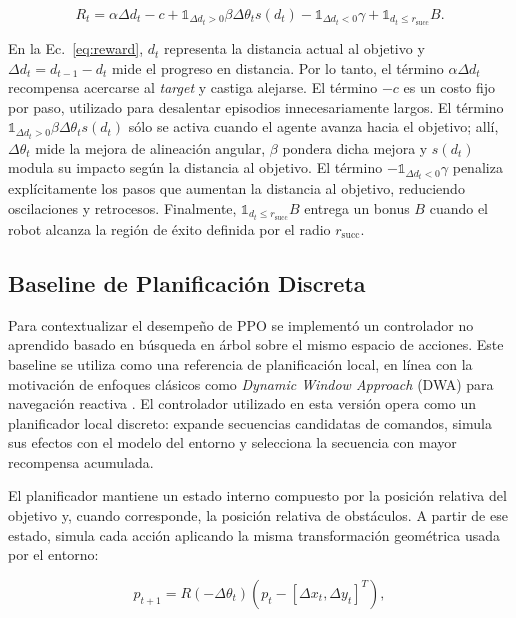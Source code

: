\documentclass[conference]{IEEEtran}
\begin{document}
\begin{equation}
    R_t =
    \alpha \Delta d_t
    - c
    + \mathbb{1}_{\Delta d_t > 0}\beta \Delta \theta_t s(d_t)
    - \mathbb{1}_{\Delta d_t < 0}\gamma
    + \mathbb{1}_{d_t \leq r_{\text{succ}}}B .
    \label{eq:reward}
\end{equation}

En la Ec.~\ref{eq:reward}, $d_t$ representa la distancia actual al objetivo y $\Delta d_t=d_{t-1}-d_t$ mide el progreso en distancia. Por lo tanto, el término $\alpha\Delta d_t$ recompensa acercarse al \textit{target} y castiga alejarse. El término $-c$ es un costo fijo por paso, utilizado para desalentar episodios innecesariamente largos. El término $\mathbb{1}_{\Delta d_t > 0}\beta \Delta \theta_t s(d_t)$ sólo se activa cuando el agente avanza hacia el objetivo; allí, $\Delta \theta_t$ mide la mejora de alineación angular, $\beta$ pondera dicha mejora y $s(d_t)$ modula su impacto según la distancia al objetivo. El término $-\mathbb{1}_{\Delta d_t < 0}\gamma$ penaliza explícitamente los pasos que aumentan la distancia al objetivo, reduciendo oscilaciones y retrocesos. Finalmente, $\mathbb{1}_{d_t \leq r_{\text{succ}}}B$ entrega un bonus $B$ cuando el robot alcanza la región de éxito definida por el radio $r_{\text{succ}}$.

\subsection{Baseline de Planificación Discreta}
Para contextualizar el desempeño de PPO se implementó un controlador no aprendido basado en búsqueda en árbol sobre el mismo espacio de acciones. Este baseline se utiliza como una referencia de planificación local, en línea con la motivación de enfoques clásicos como \textit{Dynamic Window Approach} (DWA) para navegación reactiva \cite{dwa}. El controlador utilizado en esta versión opera como un planificador local discreto: expande secuencias candidatas de comandos, simula sus efectos con el modelo del entorno y selecciona la secuencia con mayor recompensa acumulada.

El planificador mantiene un estado interno compuesto por la posición relativa del objetivo y, cuando corresponde, la posición relativa de obstáculos. A partir de ese estado, simula cada acción aplicando la misma transformación geométrica usada por el entorno:

\begin{equation}
    p_{t+1} = R(-\Delta\theta_t)(p_t - [\Delta x_t,\Delta y_t]^T),
    \label{eq:baseline-transform}
\end{equation}
\end{document}
